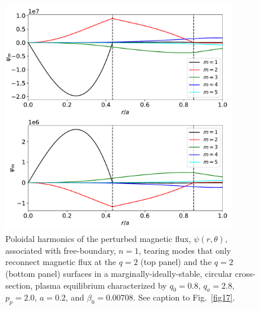 \documentclass[12pt,prb,aps]{revtex4-1}
\begin{document}
\begin{figure}
\centerline{\includegraphics[width=0.9\textwidth]{Fig19.pdf}}
\caption{Poloidal harmonics of the perturbed magnetic flux, $\psi(r,\theta)$,  associated with free-boundary, $n=1$, tearing modes that only reconnect magnetic flux at the $q=2$  (top panel) and the $q=2$ (bottom panel) surfaces in a marginally-ideally-stable, 
circular cross-section,  plasma equilibrium characterized by $q_0=0.8$, $q_a= 2.8$, $p_p=2.0$, 
$a=0.2$, and $\beta_0=0.00708$. See caption to Fig.~\ref{fig17}.\label{fig19}}
\end{figure}
\end{document}
